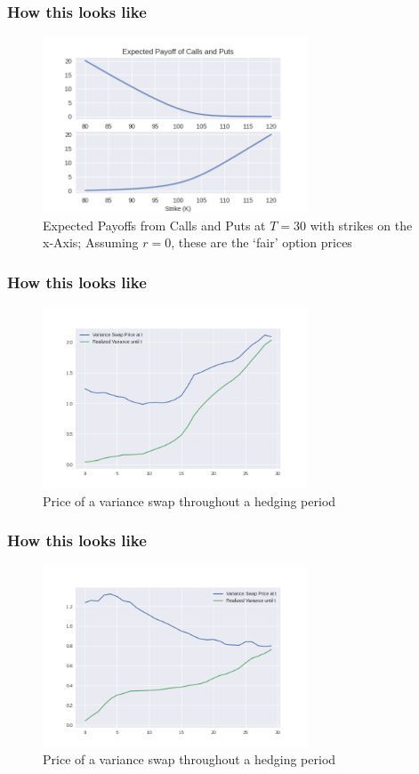 \documentclass[serif]{beamer}
\begin{document}
\begin{frame}
    \frametitle{How this looks like}
    \begin{figure}
        \includegraphics[width=0.7\textwidth]{./images/call_put_payoff.png}
        \caption{
            Expected Payoffs from Calls and Puts at $T=30$ with strikes
            on the x-Axis; Assuming $r=0$, these are the `fair' option prices
        }
    \end{figure}
\end{frame}

\begin{frame}
    \frametitle{How this looks like}
    \begin{figure}
        \includegraphics[width=0.7\textwidth]{./images/var_swap_price1.png}
        \caption{
            Price of a variance swap throughout a hedging period
        }
    \end{figure}
\end{frame}

\begin{frame}
    \frametitle{How this looks like}
    \begin{figure}
        \includegraphics[width=0.7\textwidth]{./images/var_swap_price.png}
        \caption{
            Price of a variance swap throughout a hedging period
        }
    \end{figure}
\end{frame}
\end{document}
